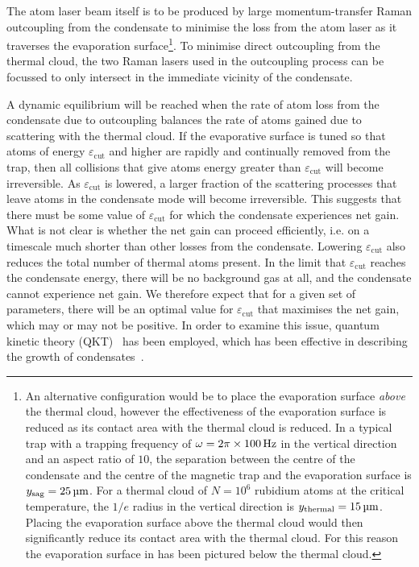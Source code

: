 The atom laser beam itself is to be produced by large momentum-transfer Raman outcoupling from the condensate to minimise the loss from the atom laser as it traverses the evaporation surface\footnote{An alternative configuration would be to place the evaporation surface \emph{above} the thermal cloud, however the effectiveness of the evaporation surface is reduced as its contact area with the thermal cloud is reduced. In a typical trap with a trapping frequency of $\omega = 2\pi \times \unit[100]{Hz}$ in the vertical direction and an aspect ratio of $10$, the separation between the centre of the condensate and the centre of the magnetic trap and the evaporation surface is $y_\text{sag} = \unit[25]{\micro m}$.  For a thermal cloud of $N=10^6$ rubidium atoms at the critical temperature, the $1/e$ radius in the vertical direction is $y_\text{thermal} = \unit[15]{\micro m}$. Placing the evaporation surface above the thermal cloud would then significantly reduce its contact area with the thermal cloud. For this reason the evaporation surface in  has been pictured below the thermal cloud.}. To minimise direct outcoupling from the thermal cloud, the two Raman lasers used in the outcoupling process can be focussed to only intersect in the immediate vicinity of the condensate.

A dynamic equilibrium will be reached when the rate of atom loss from the condensate due to outcoupling balances the rate of atoms gained due to scattering with the thermal cloud.  If the evaporative surface is tuned so that atoms of energy $\varepsilon_\text{cut}$ and higher are rapidly and continually removed from the trap, then all collisions that give atoms energy greater than $\varepsilon_\text{cut}$ will become irreversible. As $\varepsilon_\text{cut}$ is lowered, a larger fraction of the scattering processes that leave atoms in the condensate mode will become irreversible. This suggests that there must be some value of $\varepsilon_\text{cut}$ for which the condensate experiences net gain. What is not clear is whether the net gain can proceed efficiently, i.e. on a timescale much shorter than other losses from the condensate.  Lowering $\varepsilon_\text{cut}$ also reduces the total number of thermal atoms present. In the limit that $\varepsilon_\text{cut}$ reaches the condensate energy, there will be no background gas at all, and the condensate cannot experience net gain.  We therefore expect that for a given set of parameters, there will be an optimal value for $\varepsilon_\text{cut}$ that maximises the net gain, which may or may not be positive. In order to examine this issue, quantum kinetic theory (QKT)~\citep{Gardiner:1997tz,Jaksch:1997ug,Gardiner:1998wx,Jaksch:1998sj,Gardiner:2000ug,Lee:2000vs,Davis:2000vn} has been employed, which has been effective in describing the growth of condensates~\citep{Davis:2000vn}.


